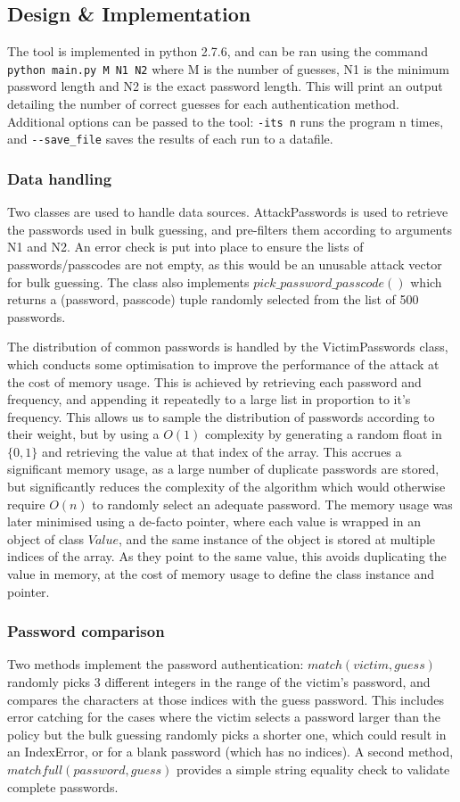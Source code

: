 \documentclass[british,10pt,a4paper]{article}
\begin{document}
\subsection{Design \& Implementation}
The tool is implemented in python 2.7.6, and can be ran using the command \lstinline{python main.py M N1 N2} where M is the number of guesses, N1 is the minimum password length and N2 is the exact password length. This will print an output detailing the number of correct guesses for each authentication method. Additional options can be passed to the tool: \lstinline{-its n} runs the program n times, and \lstinline{--save_file} saves the results of each run to a datafile.


\subsubsection{Data handling}
Two classes are used to handle data sources. AttackPasswords is used to retrieve the passwords used in bulk guessing, and pre-filters them according to arguments N1 and N2. An error check is put into place to ensure the lists of passwords/passcodes are not empty, as this would be an unusable attack vector for bulk guessing. The class also implements $pick\_password\_passcode()$ which returns a (password, passcode) tuple randomly selected from the list of 500 passwords.

The distribution of common passwords is handled by the VictimPasswords class, which conducts some optimisation to improve the performance of the attack at the cost of memory usage. This is achieved by retrieving each password and frequency, and appending it repeatedly to a large list in proportion to it's frequency. This allows us to sample the distribution of passwords according to their weight, but by using a $O(1)$ complexity by generating a random float in $\{0,1\}$ and retrieving the value at that index of the array. This accrues a significant memory usage, as a large number of duplicate passwords are stored, but significantly reduces the complexity of the algorithm which would otherwise require $O(n)$ to randomly select an adequate password. The memory usage was later minimised using a de-facto pointer, where each value is wrapped in an object of class $Value$, and the same instance of the object is stored at multiple indices of the array. As they point to the same value, this avoids duplicating the value in memory, at the cost of memory usage to define the class instance and pointer.

\subsubsection{Password comparison}
Two methods implement the password authentication: $match(victim, guess)$ randomly picks 3 different integers in the range of the victim's password, and compares the characters at those indices with the guess password. This includes error catching for the cases where the victim selects a password larger than the policy but the bulk guessing randomly picks a shorter one, which could result in an IndexError, or for a blank password (which has no indices). A second method, $matchfull(password, guess)$ provides a simple string equality check to validate complete passwords.
 
\end{document}

